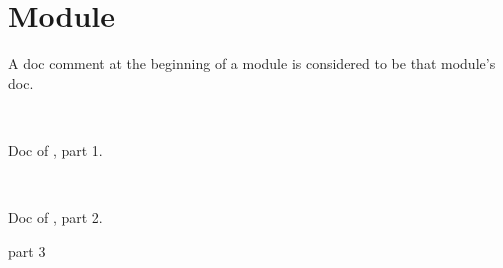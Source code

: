 \section{Module }\label{Toplevel_comments}%
A doc comment at the beginning of a module is considered to be that module's doc.

\label{Toplevel_comments--module-type-T}\label{Toplevel_comments-module-type-T}\begin{ocamlindent}\label{Toplevel_comments-module-type-T--type-t}\\
\end{ocamlindent}%
\begin{ocamlindent}Doc of , part 1.\end{ocamlindent}%
\medbreak
\label{Toplevel_comments--module-Include_inline}\label{Toplevel_comments-Include_inline}\begin{ocamlindent} \hyperref[Toplevel_comments-module-type-T]{}\label{Toplevel_comments-Include_inline--type-t}\\
\end{ocamlindent}%
\begin{ocamlindent}Doc of , part 2.\end{ocamlindent}%
\medbreak
\label{Toplevel_comments--module-Include_inline'}\label{Toplevel_comments-Include_inline'}\begin{ocamlindent}part 3 \hyperref[Toplevel_comments-module-type-T]{}\label{Toplevel_comments-Include_inline'--type-t}\\
\end{ocamlindent}%
